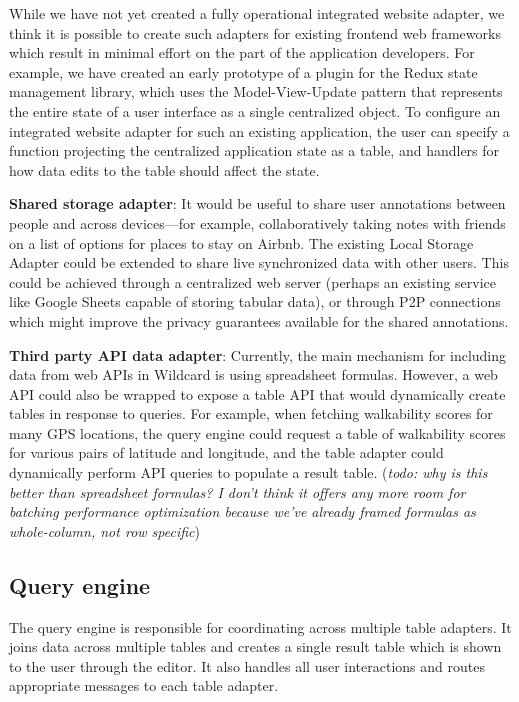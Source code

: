 \documentclass[sigplan,10pt,anonymous,review]{acmart}
\begin{document}
While we have not yet created a fully operational integrated website
adapter, we think it is possible to create such adapters for existing
frontend web frameworks which result in minimal effort on the part of
the application developers. For example, we have created an early
prototype of a plugin for the Redux state management library, which uses
the Model-View-Update pattern that represents the entire state of a user
interface as a single centralized object. To configure an integrated
website adapter for such an existing application, the user can specify a
function projecting the centralized application state as a table, and
handlers for how data edits to the table should affect the state.

\textbf{Shared storage adapter}: It would be useful to share user
annotations between people and across devices---for example,
collaboratively taking notes with friends on a list of options for
places to stay on Airbnb. The existing Local Storage Adapter could be
extended to share live synchronized data with other users. This could be
achieved through a centralized web server (perhaps an existing service
like Google Sheets capable of storing tabular data), or through P2P
connections which might improve the privacy guarantees available for the
shared annotations.

\textbf{Third party API data adapter}: Currently, the main mechanism for
including data from web APIs in Wildcard is using spreadsheet formulas.
However, a web API could also be wrapped to expose a table API that
would dynamically create tables in response to queries. For example,
when fetching walkability scores for many GPS locations, the query
engine could request a table of walkability scores for various pairs of
latitude and longitude, and the table adapter could dynamically perform
API queries to populate a result table. (\emph{todo: why is this better
than spreadsheet formulas? I don't think it offers any more room for
batching performance optimization because we've already framed formulas
as whole-column, not row specific})

\hypertarget{query-engine}{%
\subsection{Query engine}\label{query-engine}}

The query engine is responsible for coordinating across multiple table
adapters. It joins data across multiple tables and creates a single
result table which is shown to the user through the editor. It also
handles all user interactions and routes appropriate messages to each
table adapter.
\end{document}
